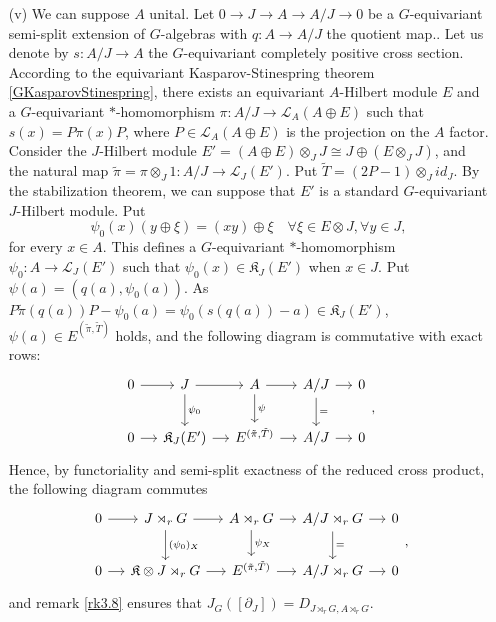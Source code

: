 \begin{dem}
\begin{enumerate}
\item[(v)] We can suppose $A$ unital. Let $0 \rightarrow J \rightarrow A \rightarrow A /J \rightarrow 0$ be a $G$-equivariant semi-split extension of $G$-algebras with $q:A\rightarrow A/J$ the quotient map.. Let us denote by $s : A/J \rightarrow A $ the $G$-equivariant completely positive cross section.   According to the equivariant Kasparov-Stinespring theorem \ref{GKasparovStinespring}, there exists an equivariant $A$-Hilbert module $E$ and a $G$-equivariant $*$-homomorphism $\pi : A/J \rightarrow \mathcal L_{A}(A\oplus E)$ such that $s(x) = P \pi(x) P$, where $P \in \mathcal L_{A}(A\oplus E)$ is the projection on the $A$ factor. Consider the $J$-Hilbert module $E' = (A\oplus E)\otimes_J J \cong J\oplus (E\otimes_J J)$, and the natural map $\tilde\pi =\pi\otimes_J 1: A/ J \rightarrow \mathcal L_{J}(E')$. Put $\tilde T= (2P-1)\otimes_J id_J$. By the stabilization theorem, we can suppose that $E'$ is a standard $G$-equivariant $J$-Hilbert module. 
Put 
\[\psi_0(x)(y \oplus \xi ) =  (xy) \oplus \xi\quad \forall \xi \in E\otimes J,\forall y\in J, \] 
for every $x\in A$. This defines a $G$-equivariant $*$-homomorphism $\psi_0 : A \rightarrow \mathcal L_J(E')$ such that $\psi_0(x)\in  \mathfrak K _J (E')$ when $x\in J$. Put $\psi ( a ) = (q(a), \psi_0 (a))$. As $P\tilde \pi (q(a))P -\psi_0(a) = \psi_0( s(q(a)) - a )\in \mathfrak K_J(E')$, $\psi(a)\in E^{(\tilde\pi,\tilde T)}$ holds, and the following diagram is commutative with exact rows:
\[\begin{tikzcd}[column sep = small]
0\arrow{r} &J\arrow{r}\arrow{d}{\psi_0} & A \arrow{r}\arrow{d}{\psi}& A/J\arrow{r}\arrow{d}{=} & 0\\
0\arrow{r} & \mathfrak K_J(E')\arrow{r} & E^{(\tilde \pi, \tilde T)} \arrow{r}& A/J\arrow{r} & 0
\end{tikzcd},\]
Hence, by functoriality and semi-split exactness of the reduced cross product, the following diagram commutes
\[\begin{tikzcd}[column sep = small]
0\arrow{r} & J\rtimes_r G\arrow{r}\arrow{d}{(\psi_0)_X} & A\rtimes_r G \arrow{r}\arrow{d}{\psi_X}& A/J\rtimes_r G \arrow{r}\arrow{d}{=} & 0\\
0\arrow{r} & \mathfrak K \otimes J\rtimes_r G\arrow{r} & E^{(\tilde \pi, \tilde T)} \arrow{r}& A/J\rtimes_r G \arrow{r} & 0
\end{tikzcd},\]
and remark \ref{rk3.8} ensures that $J_G([\partial_J]) = D_{J\rtimes_r G,A\rtimes_r G}$. 


\end{enumerate}
\end{dem}

